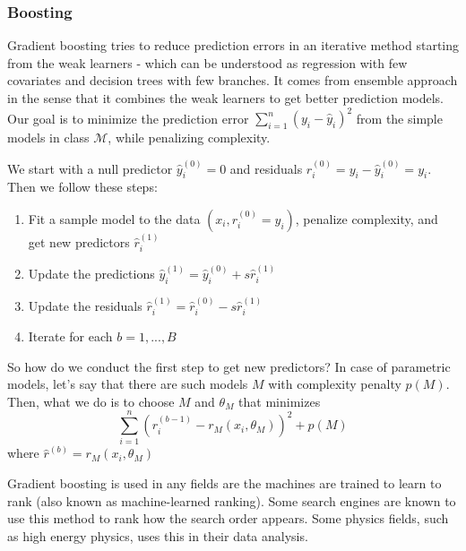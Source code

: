 \documentclass[12pt]{article}
\theoremstyle{definition}
\theoremstyle{property}
\theoremstyle{assumption}
\theoremstyle{example}
\theoremstyle{comment}
\begin{document}
\subsubsection{Boosting}
Gradient boosting tries to reduce prediction errors in an iterative method starting from the weak learners - which can be understood as regression with few covariates and decision trees with few branches. It comes from ensemble approach in the sense that it combines the weak learners to get better prediction models. Our goal is to minimize the prediction error $\sum_{i=1}^n (y_i-\hat{y}_i)^2 $ from the simple models in class $\mathcal{M}$, while penalizing complexity. 
\par
We start with a null predictor $\hat{y}_i^{(0)}=0$ and residuals $r_i^{(0)}=y_i-\hat{y}_i^{(0)}=y_i$. Then we follow these steps:
\begin{enumerate}
\item Fit a sample model to the data $(x_i, r_i^{(0)} =y_i)$, penalize complexity, and get new predictors $\hat{r}_i^{(1)}$
\item Update the predictions $\hat{y}_i^{(1)}=\hat{y}_i^{(0)}+s\hat{r}_i^{(1)}$
\item Update the residuals $\hat{r}_i^{(1)}=\hat{r}_i^{(0)}-s\hat{r}_i^{(1)}$
\item Iterate for each $b=1,...,B$
\end{enumerate} \par
So how do we conduct the first step to get new predictors? In case of parametric models, let's say that there are such models $M$ with complexity penalty $p(M)$. Then, what we do is to choose $M$ and $\theta_M$ that minimizes
\[
\sum_{i=1}^n (r_i^{(b-1)}-r_M(x_i,\theta_M))^2+p(M)
\]
where $\hat{r}^{(b)}=r_M(x_i,\theta_M)$\par
Gradient boosting is used in any fields are the machines are trained to learn to rank (also known as machine-learned ranking). Some search engines are known to use this method to rank how the search order appears.  Some physics fields, such as high energy physics, uses this in their data analysis. 
\end{document}
